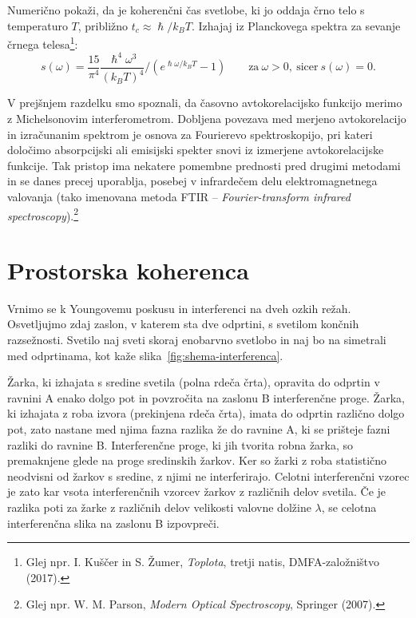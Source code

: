 \begin{naloga}\label{naloga-Planck}
Numerično pokaži, da je koherenčni čas svetlobe, ki jo oddaja črno telo s 
temperaturo $T$, približno $t_{c}\approx{\hslash}/{k_{B}T}$.
Izhajaj iz Planckovega spektra za sevanje črnega telesa\footnote{Glej
npr. I. Kuščer in S. Žumer, {\it Toplota}, tretji natis, DMFA-založništvo (2017).}:
\begin{equation}
s(\omega)=\frac{15}{\pi^{4}} \frac{\hslash^4\omega^3}{(k_{B}T)^4}/\left(e^{\hslash\omega/k_{B}T}-1\right)
\qquad \textrm{za}~\omega >0,~\textrm{sicer}~s(\omega) = 0.
\label{eq:Planckov-spekter}
\end{equation}
\end{naloga}

\begin{remark}
V prejšnjem razdelku smo spoznali, da časovno avtokorelacijsko funkcijo
merimo z Michelsonovim interferometrom. Dobljena povezava med merjeno
avtokorelacijo in izračunanim spektrom je osnova za Fourierevo 
spektroskopijo,
pri kateri določimo absorpcijski ali emisijski spekter
snovi iz izmerjene avtokorelacijske funkcije. Tak pristop
ima nekatere pomembne prednosti pred drugimi metodami in se danes
precej uporablja, posebej v infrardečem delu elektromagnetnega valovanja (tako imenovana
metoda FTIR -- {\it Fourier-transform infrared spectroscopy}).\footnote{Glej
npr. W. M. Parson, {\it Modern Optical Spectroscopy}, Springer (2007).}
\end{remark}

\section{Prostorska koherenca}
\label{Prostorska-koherenca}
Vrnimo se k Youngovemu poskusu in interferenci
 na dveh ozkih režah. Osvetljujmo zdaj zaslon, v katerem sta dve odprtini,
s svetilom končnih razsežnosti. Svetilo naj sveti skoraj enobarvno
svetlobo in naj bo na simetrali med odprtinama, kot kaže slika~\ref{fig:shema-interferenca}.

Žarka, ki izhajata s sredine svetila (polna rdeča črta), 
opravita do odprtin v ravnini A enako dolgo pot in povzročita na zaslonu B 
interferenčne proge. Žarka, ki izhajata z roba izvora (prekinjena rdeča črta), 
imata do odprtin različno dolgo pot, zato nastane med njima fazna razlika že do ravnine A, 
ki se prišteje fazni razliki do ravnine B. Interferenčne proge, ki jih tvorita 
robna žarka, so premaknjene glede na proge sredinskih žarkov. Ker so žarki z roba
statistično neodvisni od žarkov s sredine, z njimi
ne interferirajo. Celotni interferenčni vzorec je zato kar vsota interferenčnih
vzorcev žarkov z različnih delov svetila. Če je razlika poti za žarke
z različnih delov velikosti valovne dolžine $\lambda$, se celotna
interferenčna slika na zaslonu B izpovpreči.

